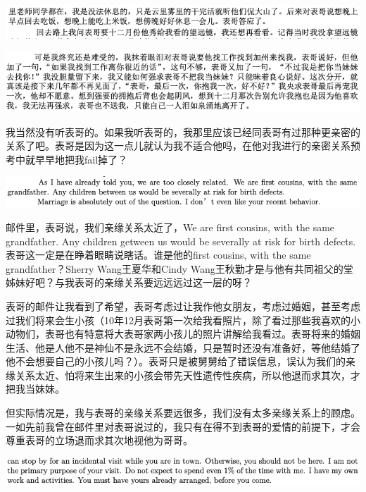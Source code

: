 \documentclass[9pt, b5paper]{article}
\begin{document}
\begin{center}
\includegraphics[width=.9\linewidth]{./pic/p1p57-3.png}
\end{center}

\begin{center}
\includegraphics[width=.9\linewidth]{./pic/p1p58-2.png}
\end{center}

我当然没有听表哥的。如果我听表哥的，我那里应该已经同表哥有过那种更亲密的关系了吧。表哥是因为这一点儿就认为我不适合他吗，在他对我进行的亲密关系预考中就早早地把我fail掉了？

\begin{center}
\includegraphics[width=.9\linewidth]{./pic/p1p63-4.png}
\end{center}

邮件里，表哥说，我们亲缘关系太近了，We are first cousins, with the same grandfather. Any children getween us would be severally at risk for birth defects.表哥这一定是在睁着眼睛说瞎话。谁是他的first cousins, with the same grandfather？Sherry Wang王夏华和Cindy Wang王秋勤才是与他有共同祖父的堂姊妹好吧？与我表哥的亲缘关系要远远远过这一层的呀？

表哥的邮件让我看到了希望，表哥考虑过让我作他女朋友，考虑过婚姻，甚至考虑过我们将来会生小孩（10年12月表哥第一次给我看照片，除了看过那些我喜欢的小动物们，表哥也有特意将大表哥家两小孩儿的照片讲解给我看过。表哥将来的婚姻生活、他是人他不是神仙不是永远不会结婚，只是暂时还没有准备好，等他结婚了他不会想要自己的小孩儿吗？）。表哥只是被舅舅给了错误信息，误认为我们的亲缘关系太近、怕将来生出来的小孩会带先天性遗传性疾病，所以他退而求其次，才把我当妹妹。

但实际情况是，我与表哥的亲缘关系要远很多，我们没有太多亲缘关系上的顾虑。一如先前我曾在邮件里对表哥说过的，我只有在得不到表哥的爱情的前提下，才会尊重表哥的立场退而求其次地视他为哥哥。 

\begin{center}
\includegraphics[width=.9\linewidth]{./pic/p1p64-1.png}
\end{center}
\end{document}
